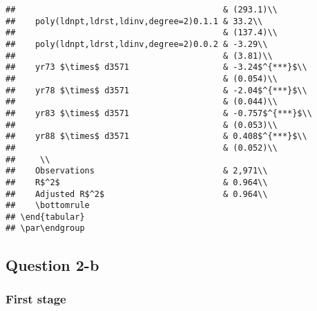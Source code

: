 \documentclass[
]{article}
\begin{document}
\begin{verbatim}
##                                          & (293.1)\\   
##    poly(ldnpt,ldrst,ldinv,degree=2)0.1.1 & 33.2\\   
##                                          & (137.4)\\   
##    poly(ldnpt,ldrst,ldinv,degree=2)0.0.2 & -3.29\\   
##                                          & (3.81)\\   
##    yr73 $\times$ d3571                   & -3.24$^{***}$\\   
##                                          & (0.054)\\   
##    yr78 $\times$ d3571                   & -2.04$^{***}$\\   
##                                          & (0.044)\\   
##    yr83 $\times$ d3571                   & -0.757$^{***}$\\   
##                                          & (0.053)\\   
##    yr88 $\times$ d3571                   & 0.408$^{***}$\\   
##                                          & (0.052)\\   
##     \\
##    Observations                          & 2,971\\  
##    R$^2$                                 & 0.964\\  
##    Adjusted R$^2$                        & 0.964\\  
##    \bottomrule
## \end{tabular}
## \par\endgroup
\end{verbatim}

\hypertarget{question-2-b}{%
\subsection{Question 2-b}\label{question-2-b}}

\hypertarget{first-stage}{%
\subsubsection{First stage}\label{first-stage}}
\end{document}
